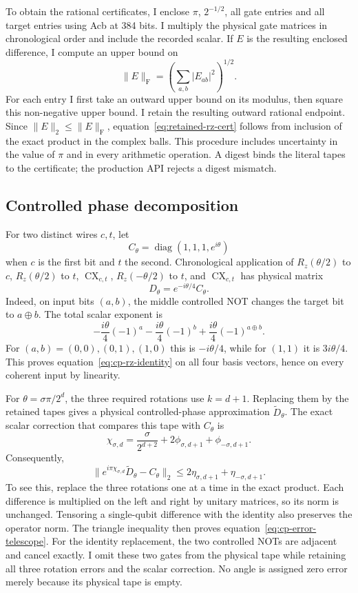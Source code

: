To obtain the rational certificates, I enclose $\pi$, $2^{-1/2}$, all gate entries and all target entries using Acb at 384 bits. I multiply the physical gate matrices in chronological order and include the recorded scalar. If $E$ is the resulting enclosed difference, I compute an upper bound on
\[
 \|E\|_{\mathrm F}
   =\left(\sum_{a,b}|E_{ab}|^2\right)^{1/2}.
\]
For each entry I first take an outward upper bound on its modulus, then square this non-negative upper bound. I retain the resulting outward rational endpoint. Since $\|E\|_2\leq\|E\|_{\mathrm F}$, equation~\eqref{eq:retained-rz-cert} follows from inclusion of the exact product in the complex balls. This procedure includes uncertainty in the value of $\pi$ and in every arithmetic operation. A digest binds the literal tapes to the certificate; the production API rejects a digest mismatch.

\subsection{Controlled phase decomposition}

For two distinct wires $c,t$, let
\[
 C_{\theta}=\operatorname{diag}(1,1,1,e^{i\theta})
\]
when $c$ is the first bit and $t$ the second. Chronological application of $R_z(\theta/2)$ to $c$, $R_z(\theta/2)$ to $t$, $\operatorname{CX}_{c,t}$, $R_z(-\theta/2)$ to $t$, and $\operatorname{CX}_{c,t}$ has physical matrix
\begin{equation}
 D_\theta=e^{-i\theta/4}C_\theta.
 \label{eq:cp-rz-identity}
\end{equation}
Indeed, on input bits $(a,b)$, the middle controlled NOT changes the target bit to $a\mathbin{\oplus}b$. The total scalar exponent is
\[
 -\frac{i\theta}{4}(-1)^a
 -\frac{i\theta}{4}(-1)^b
 +\frac{i\theta}{4}(-1)^{a\mathbin{\oplus}b}.
\]
For $(a,b)=(0,0),(0,1),(1,0)$ this is $-i\theta/4$, while for $(1,1)$ it is $3i\theta/4$. This proves equation~\eqref{eq:cp-rz-identity} on all four basis vectors, hence on every coherent input by linearity.

For $\theta=\sigma\pi/2^d$, the three required rotations use $k=d+1$. Replacing them by the retained tapes gives a physical controlled-phase approximation $\widetilde D_\theta$. The exact scalar correction that compares this tape with $C_\theta$ is
\[
 \chi_{\sigma,d}
  =\frac{\sigma}{2^{d+2}}
    +2\phi_{\sigma,d+1}+\phi_{-\sigma,d+1}.
\]
Consequently,
\begin{equation}
 \|e^{i\pi\chi_{\sigma,d}}\widetilde D_\theta-C_\theta\|_2
 \leq2\eta_{\sigma,d+1}+\eta_{-\sigma,d+1}.
 \label{eq:cp-error-telescope}
\end{equation}
To see this, replace the three rotations one at a time in the exact product. Each difference is multiplied on the left and right by unitary matrices, so its norm is unchanged. Tensoring a single-qubit difference with the identity also preserves the operator norm. The triangle inequality then proves equation~\eqref{eq:cp-error-telescope}. For the identity replacement, the two controlled NOTs are adjacent and cancel exactly. I omit these two gates from the physical tape while retaining all three rotation errors and the scalar correction. No angle is assigned zero error merely because its physical tape is empty.

